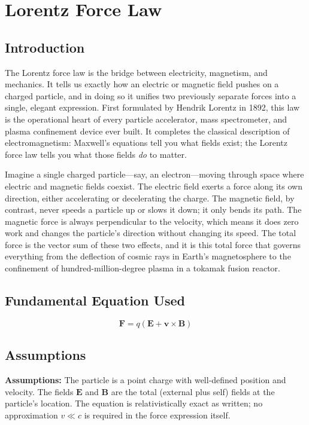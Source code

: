 \chapter{Lorentz Force Law}

\section*{Introduction}

The Lorentz force law is the bridge between electricity, magnetism, and mechanics. It tells us exactly how an electric or magnetic field pushes on a charged particle, and in doing so it unifies two previously separate forces into a single, elegant expression. First formulated by Hendrik Lorentz in 1892, this law is the operational heart of every particle accelerator, mass spectrometer, and plasma confinement device ever built. It completes the classical description of electromagnetism: Maxwell's equations tell you what fields exist; the Lorentz force law tells you what those fields \emph{do} to matter.

Imagine a single charged particle---say, an electron---moving through space where electric and magnetic fields coexist. The electric field exerts a force along its own direction, either accelerating or decelerating the charge. The magnetic field, by contrast, never speeds a particle up or slows it down; it only bends its path. The magnetic force is always perpendicular to the velocity, which means it does zero work and changes the particle's direction without changing its speed. The total force is the vector sum of these two effects, and it is this total force that governs everything from the deflection of cosmic rays in Earth's magnetosphere to the confinement of hundred-million-degree plasma in a tokamak fusion reactor.
\section*{Fundamental Equation Used}

\begin{equation}
\mathbf{F} = q\!\left(\mathbf{E} + \mathbf{v} \times \mathbf{B}\right)
\end{equation}
\section*{Assumptions}

\textbf{Assumptions:} The particle is a point charge with well-defined position and velocity. The fields $\mathbf{E}$ and $\mathbf{B}$ are the total (external plus self) fields at the particle's location. The equation is relativistically exact as written; no approximation $v \ll c$ is required in the force expression itself.


